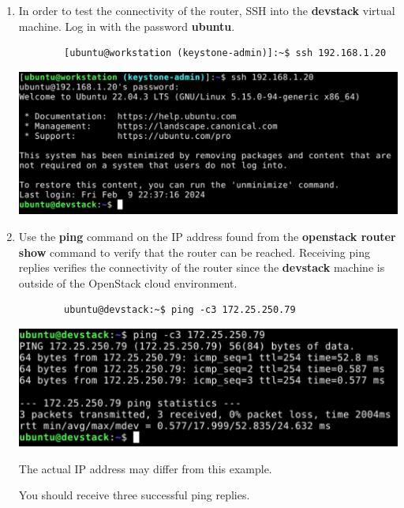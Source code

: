 \documentclass[letterpaper, 12pt]{article}
\begin{document}
\begin{enumerate}
    \item In order to test the connectivity of the router, SSH into the \textbf{devstack} virtual machine. Log in with
    the password \textbf{ubuntu}.
    \begin{lstlisting}
        [ubuntu@workstation (keystone-admin)]:~$ ssh 192.168.1.20
    \end{lstlisting}

    \begin{center}
        \includegraphics[width=\linewidth]{images/part2/step16.png}
    \end{center}

    \item Use the \textbf{ping} command on the IP address found from the \textbf{openstack router show} command to
    verify that the router can be reached. Receiving ping replies verifies the connectivity of the router since the
    \textbf{devstack} machine is outside of the OpenStack cloud environment.
    \begin{lstlisting}
        ubuntu@devstack:~$ ping -c3 172.25.250.79
    \end{lstlisting}

    \begin{center}
        \includegraphics[width=\linewidth]{images/part2/step17.png}
    \end{center}

    \begin{notebox}
        The actual IP address may differ from this example.
    \end{notebox}
    \begin{notebox}
        You should receive three successful ping replies.
    \end{notebox}


\end{enumerate}
\end{document}
